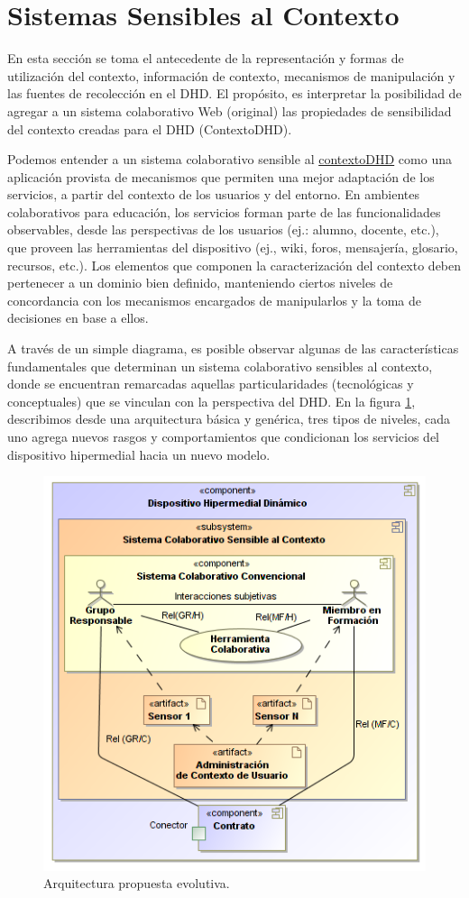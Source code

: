 \section{Sistemas Sensibles al Contexto} \label{sec:cas}


En esta sección se toma el antecedente de la representación y
formas de utilización del contexto, información de contexto, mecanismos de
manipulación y las fuentes de recolección en el DHD. El propósito, es
interpretar la posibilidad de agregar a un sistema
colaborativo Web (original) las propiedades de sensibilidad del
contexto creadas para el DHD (ContextoDHD).

Podemos entender a un sistema colaborativo sensible al
\hyperref[contextodhd]{contextoDHD} como una
aplicación provista de mecanismos que permiten una mejor adaptación de los
servicios, a partir del contexto de los usuarios y del entorno. En ambientes
colaborativos para educación, los servicios forman parte de las funcionalidades
observables, desde las perspectivas de los usuarios (ej.: alumno, docente, etc.),
que proveen las herramientas del dispositivo (ej., wiki, foros, mensajería,
glosario, recursos, etc.). Los elementos que componen la caracterización del
contexto deben pertenecer a un dominio bien definido, manteniendo ciertos
niveles de concordancia con los mecanismos encargados de manipularlos y la toma
de decisiones en base a ellos.

A través de un simple diagrama, es posible observar algunas de las características
fundamentales que determinan un sistema colaborativo sensibles al contexto,
donde se
encuentran remarcadas aquellas particularidades (tecnológicas y
conceptuales) que se vinculan con la perspectiva del DHD. En la figura
\ref{fig:evolucion}, describimos desde una arquitectura básica y genérica, tres
tipos de niveles, cada uno agrega nuevos rasgos y comportamientos que
condicionan los servicios del dispositivo hipermedial hacia un nuevo modelo.

\begin{figure}
\begin{center}
 \includegraphics[width=3.5 in,totalheight=3.5in] {Ch1/MEvolutivo.png}
\caption{Arquitectura propuesta evolutiva.}\label{fig:evolucion}
\end{center}
\end{figure}

